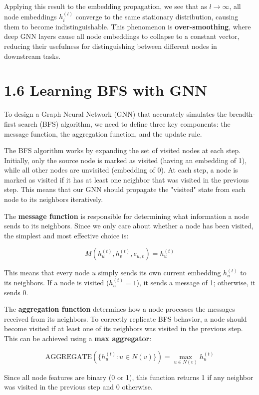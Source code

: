 \documentclass[a4paper,12pt]{article}
\begin{document}
Applying this result to the embedding propagation, we see that as \( l \to \infty \), 
all node embeddings \( h_{i}^{(l)} \) converge to the same stationary distribution, 
causing them to become indistinguishable. This phenomenon is 
\textbf{over-smoothing}, where deep GNN layers cause all node embeddings to 
collapse to a constant vector, reducing their usefulness for distinguishing between 
different nodes in downstream tasks.


\section*{1.6 Learning BFS with GNN}

To design a Graph Neural Network (GNN) that accurately simulates the breadth-first search (BFS) algorithm, we need to define three key components: the message function, the aggregation function, and the update rule.

The BFS algorithm works by expanding the set of visited nodes at each step. Initially, only the source node is marked as visited (having an embedding of 1), while all other nodes are unvisited (embedding of 0). At each step, a node is marked as visited if it has at least one neighbor that was visited in the previous step. This means that our GNN should propagate the "visited" state from each node to its neighbors iteratively.

The \textbf{message function} is responsible for determining what information a node sends to its neighbors. Since we only care about whether a node has been visited, the simplest and most effective choice is:

\[
M(h_u^{(t)}, h_v^{(t)}, e_{u,v}) = h_u^{(t)}
\]

This means that every node \( u \) simply sends its own current embedding \( h_u^{(t)} \) to its neighbors. If a node is visited (\( h_u^{(t)} = 1 \)), it sends a message of 1; otherwise, it sends 0.

The \textbf{aggregation function} determines how a node processes the messages received from its neighbors. To correctly replicate BFS behavior, a node should become visited if at least one of its neighbors was visited in the previous step. This can be achieved using a \textbf{max aggregator}:

\[
\text{AGGREGATE}(\{h_u^{(t)} : u \in N(v)\}) = \max_{u \in N(v)} h_u^{(t)}
\]

Since all node features are binary (0 or 1), this function returns 1 if any neighbor was visited in the previous step and 0 otherwise.
\end{document}

